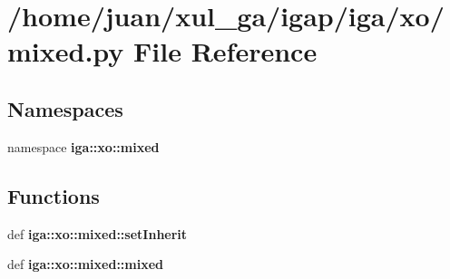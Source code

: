 \section{/home/juan/xul\_\-ga/igap/iga/xo/mixed.py File Reference}
\label{xo_2mixed_8py}
\subsection*{Namespaces}
\begin{CompactItemize}
\item 
namespace {\bf iga::xo::mixed}
\end{CompactItemize}
\subsection*{Functions}
\begin{CompactItemize}
\item 
def {\bf iga::xo::mixed::setInherit}
\item 
def {\bf iga::xo::mixed::mixed}
\end{CompactItemize}
